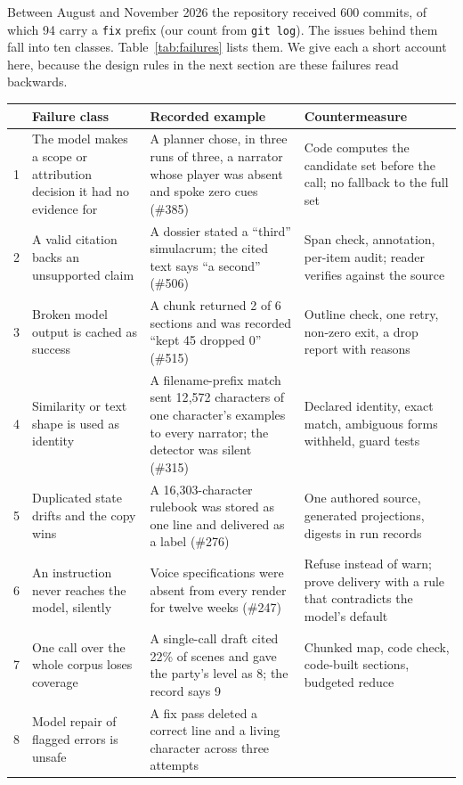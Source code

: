 \documentclass[11pt]{article}
\newcommand{\code}[1]{\texttt{#1}}
\begin{document}
Between August and November 2026 the repository received 600 commits, of which 94 carry
a \code{fix} prefix (our count from \code{git log}). The issues behind them fall into ten
classes. Table~\ref{tab:failures} lists them. We give each a short account here, because
the design rules in the next section are these failures read backwards.

\begin{table}[t]
\small
\begin{tabularx}{\textwidth}{@{}p{0.4cm}YYY@{}}
\toprule
& Failure class & Recorded example & Countermeasure \\
 & The model makes a scope or attribution decision it had no evidence for &
A planner chose, in three runs of three, a narrator whose player was absent and spoke
zero cues (\#385) &
Code computes the candidate set before the call; no fallback to the full set \\
2 & A valid citation backs an unsupported claim &
A dossier stated a ``third'' simulacrum; the cited text says ``a second'' (\#506) &
Span check, annotation, per-item audit; reader verifies against the source \\
3 & Broken model output is cached as success &
A chunk returned 2 of 6 sections and was recorded ``kept 45 dropped 0'' (\#515) &
Outline check, one retry, non-zero exit, a drop report with reasons \\
4 & Similarity or text shape is used as identity &
A filename-prefix match sent 12{,}572 characters of one character's examples to every
narrator; the detector was silent (\#315) &
Declared identity, exact match, ambiguous forms withheld, guard tests \\
5 & Duplicated state drifts and the copy wins &
A 16{,}303-character rulebook was stored as one line and delivered as a label (\#276) &
One authored source, generated projections, digests in run records \\
6 & An instruction never reaches the model, silently &
Voice specifications were absent from every render for twelve weeks (\#247) &
Refuse instead of warn; prove delivery with a rule that contradicts the model's default \\
7 & One call over the whole corpus loses coverage &
A single-call draft cited 22\% of scenes and gave the party's level as 8; the record says 9 &
Chunked map, code check, code-built sections, budgeted reduce \\
8 & Model repair of flagged errors is unsafe &
A fix pass deleted a correct line and a living character across three attempts &

\end{tabularx}
\end{table}
\end{document}
